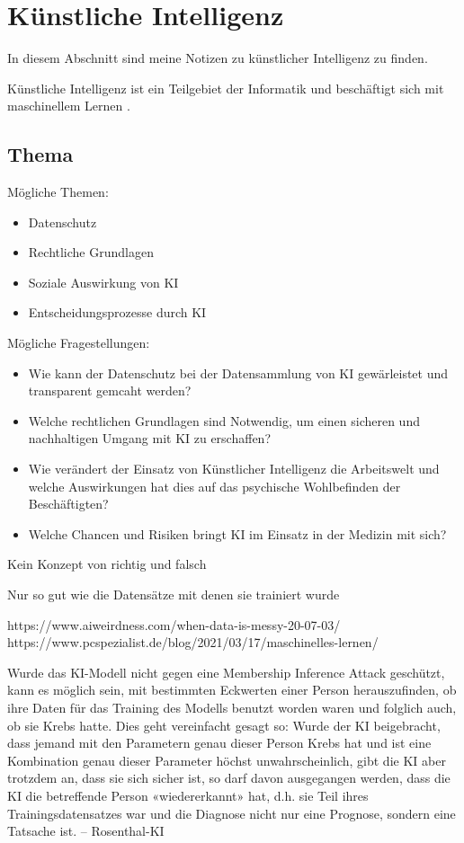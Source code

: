 \section{Künstliche Intelligenz}
\label{sec:ai}

In diesem Abschnitt sind meine Notizen zu künstlicher Intelligenz zu finden.

Künstliche Intelligenz ist ein Teilgebiet der Informatik und beschäftigt sich mit maschinellem Lernen \citep{ai-wikipedia}.
\newline

\subsection{Thema}
\setlength{\parindent}{0pt}
Mögliche Themen:
    \begin{itemize}
    \item Datenschutz
    \item Rechtliche Grundlagen
    \item Soziale Auswirkung von KI 
    \item Entscheidungsprozesse durch KI 
    \end{itemize}
Mögliche Fragestellungen:
    \begin{itemize}
    \item Wie kann der Datenschutz bei der Datensammlung von KI gewärleistet und transparent gemcaht werden?
    \item Welche rechtlichen Grundlagen sind Notwendig, um einen sicheren und nachhaltigen Umgang mit KI zu erschaffen?
    \item Wie verändert der Einsatz von Künstlicher Intelligenz die Arbeitswelt und welche Auswirkungen hat dies auf das psychische Wohlbefinden der Beschäftigten?
    \item Welche Chancen und Risiken bringt KI im Einsatz in der Medizin mit sich?
    \end{itemize}
\newpage

\begin{KI}
    \item Kein Konzept von richtig und falsch
    \item Nur so gut wie die Datensätze mit denen sie trainiert wurde
\end{KI}



https://www.aiweirdness.com/when-data-is-messy-20-07-03/
https://www.pcspezialist.de/blog/2021/03/17/maschinelles-lernen/

Wurde das KI-Modell nicht gegen
eine Membership Inference Attack geschützt, kann es möglich sein, mit bestimmten Eckwerten
einer Person herauszufinden, ob ihre Daten für das Training des Modells benutzt worden waren
und folglich auch, ob sie Krebs hatte. Dies geht vereinfacht gesagt so: Wurde der KI beigebracht,
dass jemand mit den Parametern genau dieser Person Krebs hat und ist eine Kombination genau
dieser Parameter höchst unwahrscheinlich, gibt die KI aber trotzdem an, dass sie sich sicher ist,
so darf davon ausgegangen werden, dass die KI die betreffende Person «wiedererkannt» hat, d.h.
sie Teil ihres Trainingsdatensatzes war und die Diagnose nicht nur eine Prognose, sondern eine
Tatsache ist. -- Rosenthal-KI